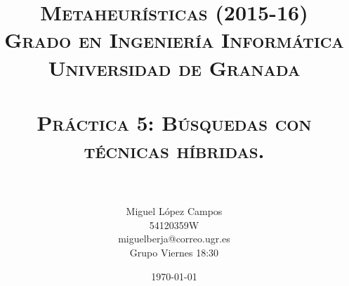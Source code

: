 

\title{
\normalfont \normalsize 
\textsc{{\bf Metaheurísticas (2015-16) \\ Grado en Ingeniería Informática \\ Universidad de Granada} \\ [25pt] %
\horrule{0.5pt} \\[0.4cm] %
\huge Práctica 5: Búsquedas con técnicas híbridas. \\ %
\horrule{2pt} \\[0.5cm] %
}}
\author{Miguel López Campos\\ 54120359W\\ miguelberja@correo.ugr.es\\ Grupo Viernes 18:30} %


\date{\normalsize\today} %


	
	\maketitle %
	\newpage %
	
	\tableofcontents %
	\listoffigures

	
	\newpage
	
	\
	
	
	
